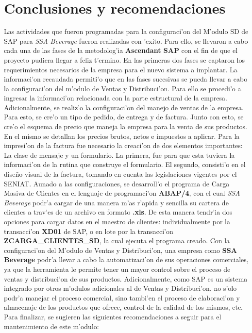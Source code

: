 \chapter{Conclusiones y recomendaciones} \label{chap:conclusiones}

	Las actividades que fueron programadas para la configuraci'on del M'odulo SD de SAP para \textit{SSA Beverage} fueron realizadas con 'exito. Para ello, se llevaron a cabo cada una de las fases de la metodolog'ia \textbf{Ascendant SAP} con el fin de que el proyecto pudiera llegar a feliz t'ermino.  En las primeras dos fases se captaron los requerimientos necesarios de la empresa para el nuevo sistema a implantar. 
\newline
\newline
\indent La informaci'on recaudada permiti'o que en las fases sucesivas se pueda llevar a cabo la configuraci'on del m'odulo de Ventas y Distribuci'on. Para ello se procedi'o a ingresar la informaci'on relacionada con la parte estructural de la empresa. Adicionalmente, se realiz'o la configuraci'on del manejo de ventas de la empresa. Para esto, se cre'o un tipo de pedido, de entrega y de factura. Junto con esto, se cre'o el esquema de precio que maneja la empresa para la venta de sus productos. En el mismo se detallan los precios brutos, netos e impuestos a aplicar. Para la impresi'on de la factura fue necesario la creaci'on de dos elementos importantes: La clase de mensaje y un formulario. La primera, fue para que esta tuviera la informaci'on de la rutina que construye el formulario. El segundo, consisti'o en el dise\~no visual de la factura, tomando en cuenta las legislaciones vigentes por el SENIAT.
\newline
\newline
\indent Aunado a las configuraciones, se desarroll'o el programa de Carga Masiva de Clientes en el lenguaje de programaci'on \textbf{ABAP/4}, con el cual \textit{SSA Beverage} podr'a cargar de una manera m'as r'apida y sencilla su cartera de clientes a trav'es de un archivo en formato \textbf{.xls}. De esta manera tendr'ia dos opciones para cargar datos en el maestro de clientes: individualmente por la transacci'on \textbf{XD01} de SAP, o en lote por la transacci'on \textbf{ZCARGA\_CLIENTES\_SD}, la cual ejecuta el programa creado.
\newline
\newline
\indent Con la configuraci'on del M'odulo de Ventas y Distribuci'on, una empresa como \textbf{SSA Beverage} podr'a llevar a cabo la automatizaci'on de sus operaciones comerciales, ya que la herramienta le permite tener un mayor control sobre el proceso de ventas y distribuci'on de sus productos. Adicionalmente, como SAP es un sistema integrado por otros m'odulos adicionales al de Ventas y Distribuci'on, no s'olo podr'a manejar el proceso comercial, sino tambi'en el proceso de elaboraci'on y almacenaje de los productos que ofrece, control de la calidad de los mismos, etc.
	Para finalizar, se sugieren las siguientes recomendaciones a seguir para el mantenimiento de este m'odulo:

